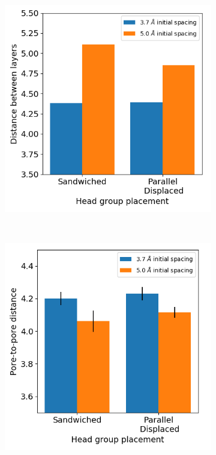 \documentclass{article}
\begin{document}
  \begin{figure}[!hbt]
        \centering
        \begin{subfigure}{0.45\linewidth}
                \centering
                \includegraphics[width=\linewidth]{dbwl.png}
                \caption{}~\label{fig:dbwl_disordered}
        \end{subfigure}%
        \begin{subfigure}{0.45\linewidth}
                \centering
                \includegraphics[width=\linewidth]{p2p2.png}

\end{subfigure}
\end{figure}
\end{document}
